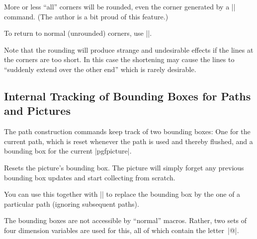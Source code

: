\begin{command}{\pgfsetcornersarced{}}
  More or less ``all'' corners will be rounded, even the corner
  generated by a |\pgfpathclose| command. (The author is a bit proud
  of this feature.)

\begin{codeexample}[]
\begin{pgfpicture}
  \pgfsetcornersarced{\pgfpoint{4pt}{4pt}}
  \pgfpathclose
\end{pgfpicture}
\end{codeexample}

  To return to normal (unrounded) corners, use
  |\pgfsetcornersarced{\pgfpointorigin}|.

  Note that the rounding will produce strange and undesirable effects
  if the lines at the corners are too short. In this case the
  shortening may cause the lines to ``suddenly extend over the other
  end'' which is rarely desirable.
\end{command}




\subsection{Internal Tracking of Bounding Boxes for Paths and Pictures}

\label{section-bb}

\makeatletter

The path construction commands keep track of two bounding boxes: One
for the current path, which is reset whenever the path is used and
thereby flushed, and a bounding box for the current |{pgfpicture}|.

\begin{command}{\pgfresetboundingbox}
	Resets the picture's bounding box. The picture will simply forget any previous bounding box updates and start collecting from scratch.
	
	You can use this together with || to replace the bounding box by the one of a particular path (ignoring subsequent paths).
\end{command}

The bounding boxes are not accessible by ``normal'' macros. Rather,
two sets of four dimension variables are used for this, all of which
contain the letter~|@|.

